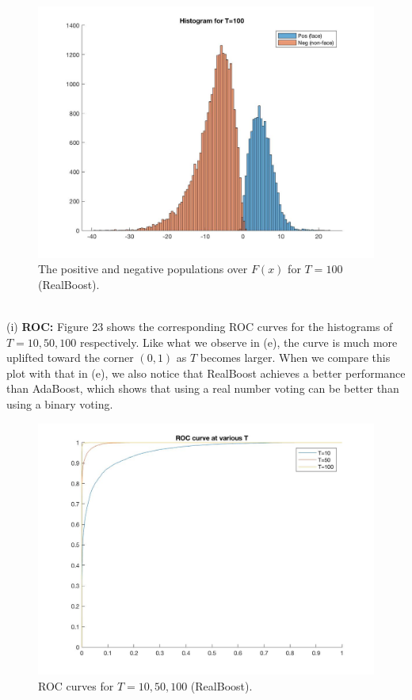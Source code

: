 \documentclass[10pt]{article}
\begin{document}
	\begin{figure}[ht]
		\includegraphics[scale = 0.2]{pos_neg_hist_100_real.jpg}
		\centering
		\caption{The positive and negative populations over $F(x)$ for $T=100$ (RealBoost).}
		\label{22}
	\end{figure}\\
	\newpage(i) \textbf{ROC:} Figure 23 shows the corresponding ROC curves for the histograms of $T=10,50,100$ respectively. Like what we observe in (e), the curve is much more uplifted toward the corner $(0,1)$ as $T$ becomes larger. When we compare this plot with that in (e), we also notice that RealBoost achieves a better performance than AdaBoost, which shows that using a real number voting can be better than using a binary voting.\\
	\begin{figure}[ht]
		\includegraphics[scale = 0.25]{roc_real.jpg}
		\centering
		\caption{ROC curves for $T=10,50,100$ (RealBoost).}
		\label{23}
	\end{figure}\\
\end{document}
